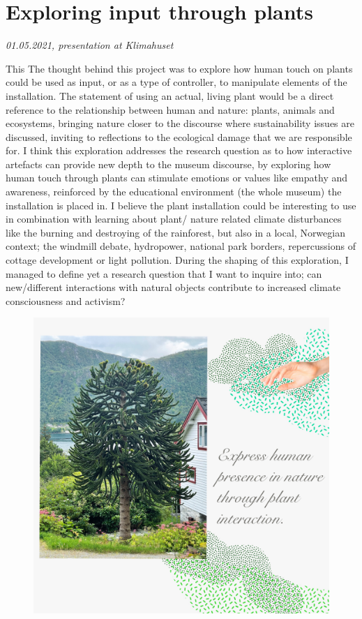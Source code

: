 \section{Exploring input through plants}
\par
\emph{01.05.2021, presentation at Klimahuset}
\par
This 
The thought behind this project was to explore how human touch on plants could be used as input, or as a type of controller, to manipulate elements of the installation. The statement of using an actual, living plant would be a direct reference to the relationship between human and nature: plants, animals and ecosystems, bringing nature closer to the discourse where sustainability issues are discussed, inviting to reflections to the ecological damage that we are responsible for. I think this exploration addresses the research question as to how interactive artefacts can provide new depth to the museum discourse, by exploring how human touch through plants can stimulate emotions or values like empathy and awareness, reinforced by the educational environment (the whole museum) the installation is placed in. I believe the plant installation could be interesting to use in combination with learning about plant/ nature related climate disturbances like the burning and destroying of the rainforest, but also in a local, Norwegian context; the windmill debate, hydropower, national park borders, repercussions of cottage development or light pollution. During the shaping of this exploration, I managed to define yet a research question that I want to inquire into; can new/different interactions with natural objects contribute to increased climate consciousness and activism?	

\begin{figure}[H]
\includegraphics[width=13cm]{pictures/human_presence.jpg}
\centering 
\end{figure}

